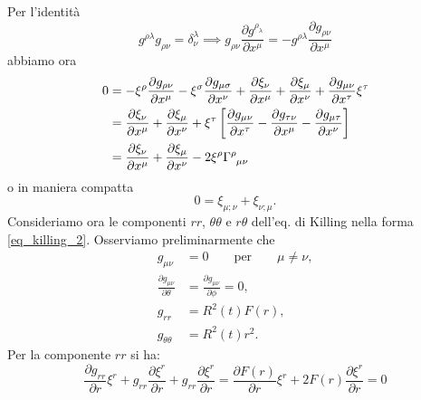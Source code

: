 Per l'identità
\begin{equation}
  g^{\rho \lambda}g_{\rho \nu} =  \delta^{\lambda}_{\nu} \implies
  g_{\rho \nu} \frac{\partial g^{\rho _\lambda}}{\partial x^{\mu}} = -
  g^{\rho \lambda} \frac{\partial g_{\rho \nu}}{\partial x^{\mu}}
\end{equation}
abbiamo ora
\begin{equation}
 \begin{split}
   0 & = - \xi^{\rho} \frac{\partial g_{\rho \nu} } {\partial x^{\mu}} -
   \xi^{\sigma} \frac{\partial g_{\mu \sigma} } {\partial x^{\nu}} +
   \frac{\partial \xi_{\nu}} {\partial x^{\mu}} + \frac{\partial \xi_{\mu}}
   {\partial x^{\nu}} +
   \frac{\partial g_{\mu \nu}}{\partial x^{\tau}} \xi^{\tau} \\
   & = \frac{\partial \xi_{\nu}} {\partial x^{\mu}} + \frac{\partial \xi_{\mu}}
   {\partial x^{\nu}} + \xi^{\tau} \left[ \frac{\partial g_{\mu \nu} } {\partial
       x^{\tau}} - \frac{\partial g_{\tau \nu} } {\partial x^{\mu}} -
     \frac{\partial g_{\mu  \tau}} {\partial x^{\nu}} \right]\\
   & = \frac{\partial \xi_{\nu}} {\partial x^{\mu}} + \frac{\partial \xi_{\mu}}
   {\partial x^{\nu}} - 2 \xi^{\rho} \tensor{\Gamma}{^{\rho}_{\mu \nu}}
\end{split}
\end{equation}
o in maniera compatta
\begin{equation}
  0 = \xi_{\mu ; \nu} + \xi_{\nu ; \mu}.
\end{equation}
Consideriamo ora le componenti $rr$, $\theta \theta $ e $r \theta $ dell'eq. di
Killing nella forma \eqref{eq_killing_2}.  Osserviamo preliminarmente che
\begin{subequations}
  \begin{align}
    g_{\mu \nu} &= 0 \qquad\text{per}\qquad \mu \ne \nu, \\
    \frac{\partial g_{\mu \nu}}{\partial \theta} &= \frac{\partial g_{\mu \nu}}
                                                   {\partial \phi} = 0, \\
    g_{r r} &= R^2(t) F(r), \\
    g_{\theta \theta} &= R^2(t) r^2.
  \end{align}
\end{subequations}
Per la componente $rr$ si ha:
\begin{equation}
  \frac{\partial g_{rr}}{\partial r} \xi^r +
  g_{rr}\frac{\partial \xi^r }{\partial r} +
  g_{rr}\frac{\partial \xi^r }{\partial r} =
  \frac{\partial F(r)}{\partial r} \xi^r +
  2 F(r) \frac{\partial \xi^r }{\partial r} = 0
  \label{eq_rr}
\end{equation}
